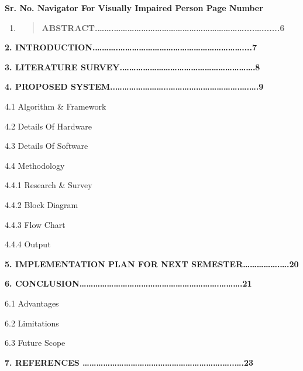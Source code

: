 \documentclass{article}
\begin{document}
\begin{table}
\begin{tabular}{}
\toprule
\endhead
\begin{minipage}[t]{0.97\columnwidth}\raggedright
\textbf{Sr. No. Navigator For Visually Impaired Person Page Number}

\begin{enumerate}
\def\labelenumi{\arabic{enumi}.}
\item
  \begin{quote}
  \textbf{ABSTRACT.\ldots\ldots.\ldots\ldots\ldots\ldots\ldots\ldots\ldots\ldots\ldots\ldots\ldots\ldots\ldots\ldots\ldots\ldots\ldots\ldots\ldots....\ldots.......6}
  \end{quote}
\end{enumerate}

\textbf{2.
INTRODUCTION.\ldots\ldots\ldots.\ldots\ldots\ldots\ldots\ldots\ldots\ldots\ldots\ldots\ldots\ldots\ldots\ldots\ldots\ldots\ldots\ldots\ldots....7}

\textbf{3. LITERATURE
SURVEY.\ldots\ldots\ldots\ldots\ldots\ldots\ldots\ldots\ldots\ldots\ldots\ldots\ldots\ldots\ldots\ldots\ldots\ldots\ldots.8}

\textbf{4. PROPOSED
SYSTEM..\ldots\ldots\ldots\ldots\ldots\ldots\ldots..\ldots\ldots\ldots\ldots\ldots\ldots\ldots\ldots\ldots\ldots.\ldots.\ldots.9}

4.1 Algorithm \& Framework

4.2 Details Of Hardware

4.3 Details Of Software

4.4 Methodology

4.4.1 Research \& Survey

4.4.2 Block Diagram

4.4.3 Flow Chart

4.4.4 Output

\textbf{5. IMPLEMENTATION PLAN FOR NEXT
SEMESTER\ldots\ldots\ldots\ldots\ldots.\ldots.20}

\textbf{6.
CONCLUSION\ldots\ldots\ldots\ldots\ldots\ldots\ldots\ldots\ldots\ldots\ldots\ldots\ldots\ldots\ldots\ldots\ldots\ldots\ldots\ldots.\ldots\ldots\ldots.21}

6.1 Advantages

6.2 Limitations

6.3 Future Scope

\textbf{7. REFERENCES
\ldots\ldots\ldots\ldots\ldots\ldots\ldots\ldots\ldots\ldots\ldots\ldots\ldots\ldots\ldots\ldots\ldots\ldots\ldots\ldots.\ldots..\ldots.23}\strut
\end{minipage}\tabularnewline
\bottomrule
\end{tabular}
	\end{table}
\end{document}
